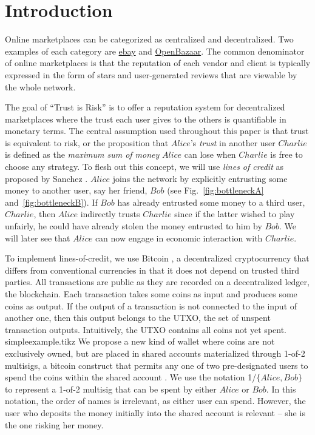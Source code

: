 \section{Introduction}
  Online marketplaces can be categorized as centralized and decentralized. Two examples of each category are
  \href{http://www.ebay.com}{ebay} and \href{https://openbazaar.org/}{OpenBazaar}. The common denominator of online
  marketplaces is that the reputation of each vendor and client is typically expressed in the form of stars and user-generated
  reviews that are viewable by the whole network.

  The goal of ``Trust is Risk'' is to offer a reputation system for decentralized marketplaces where the trust each user gives
  to the others is quantifiable in monetary terms. The central assumption used throughout this paper is that trust is
  equivalent to risk, or the proposition that $Alice$'s \textit{trust} in another user $Charlie$ is defined as the
  \textit{maximum sum of money} $Alice$ can lose when $Charlie$ is free to choose any strategy. To flesh out this concept, we
  will use \textit{lines of credit} as proposed by Sanchez \cite{loc}. $Alice$ joins the network by explicitly entrusting some
  money to another user, say her friend, $Bob$ (see Fig.~\ref{fig:bottleneckA} and~\ref{fig:bottleneckB}). If $Bob$ has
  already entrusted some money to a third user, $Charlie$, then $Alice$ indirectly trusts $Charlie$ since if the latter wished
  to play unfairly, he could have already stolen the money entrusted to him by $Bob$. We will later see that $Alice$ can now
  engage in economic interaction with $Charlie$.

  To implement lines-of-credit, we use Bitcoin \cite{bitcoin}, a decentralized cryptocurrency that differs from conventional
  currencies in that it does not depend on trusted third parties. All transactions are public as they are recorded on a
  decentralized ledger, the blockchain. Each transaction takes some coins as input and produces some coins as output. If the
  output of a transaction is not connected to the input of another one, then this output belongs to the UTXO, the set of
  unspent transaction outputs. Intuitively, the UTXO contains all coins not yet spent.
  {simpleexample.tikz}
  \noindent We propose a new kind of wallet where coins are not exclusively owned, but are placed in shared accounts materialized
  through 1-of-2 multisigs, a bitcoin construct that permits any one of two pre-designated users to spend the coins within the
  shared account \cite{masteringbitcoin}. We use the notation 1/$\{Alice, Bob\}$ to represent a 1-of-2 multisig that can be
  spent by either $Alice$ or $Bob$. In this notation, the order of names is irrelevant, as either user can spend.  However,
  the user who deposits the money initially into the shared account is relevant -- she is the one risking her money.

